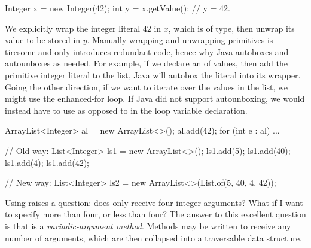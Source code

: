 \begin{verbnobox}[\small]
Integer x = new Integer(42);
int y = x.getValue(); // y = 42.
\end{verbnobox}

We explicitly wrap the integer literal $42$ in $x$, which is of  type, then unwrap its value to be stored in $y$. Manually wrapping and unwrapping primitives is tiresome and only introduces redundant code, hence why Java autoboxes and autounboxes as needed. For example, if we declare an  of  values, then add the primitive integer literal  to the list, Java will autobox the literal into its  wrapper. Going the other direction, if we want to iterate over the values in the list, we might use the enhanced-for loop. If Java did not support autounboxing, we would instead have to use  as opposed to  in the loop variable declaration. 

\begin{verbnobox}[\small]
ArrayList<Integer> al = new ArrayList<>();
al.add(42);
for (int e : al) {
  ...
}
\end{verbnobox}


\begin{verbnobox}[\small]
// Old way:
List<Integer> ls1 = new ArrayList<>();
ls1.add(5);
ls1.add(40);
ls1.add(4);
ls1.add(42);

// New way:
List<Integer> ls2 = new ArrayList<>(List.of(5, 40, 4, 42));
\end{verbnobox}
Using  raises a question: does  only receive four integer arguments? What if I want to specify more than four, or less than four? The answer to this excellent question is that  is a \emph{variadic-argument method}. Methods may be written to receive any number of arguments, which are then collapsed into a traversable data structure.


